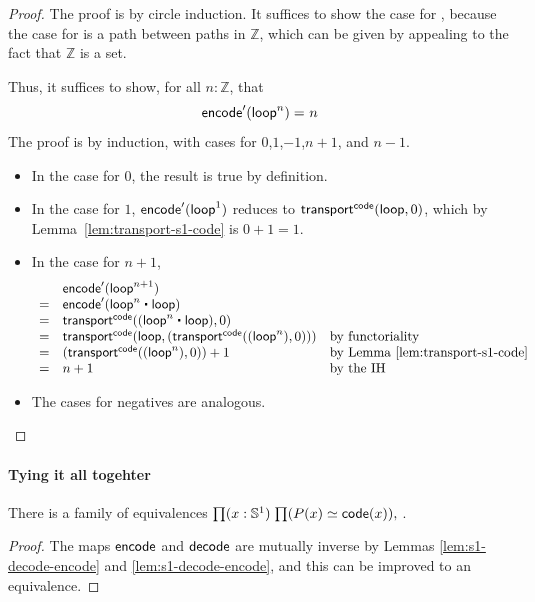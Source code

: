 \begin{proof}
The proof is by circle induction.  It suffices to show the case for
\base, because the case for \lloop is a path between paths in
$\mathbb{Z}$, which can be given by appealing to the fact that $\mathbb{Z}$ is a set.  

Thus, it suffices to show, for all $n : \mathbb{Z}$, that
\[
\mathsf{encode}'(\mathsf{loop}^n) =_{} n
\]
The proof is by induction, with cases for $0$,$1$,$-1$,$n+1$, and
$n-1$.  

\begin{itemize}

\item In the case for $0$, the result is true by definition.

\item In the case for $1$, ${\mathsf{encode}'(\mathsf{loop}^1)}$ reduces to 
$\mathsf{transport}^{\mathsf{code}}(\mathsf{loop},0)$, which by
Lemma~\ref{lem:transport-s1-code} is $0 + 1 = 1$.  

\item In the case for $n+1$, 
\[
\begin{array}{lll}
  & {\encode'(\lloop^{n+1})}  \\
= & {\encode'(\lloop^{n} \ct \lloop)} & \\
= & \transfib{\code}{(\lloop^{n} \ct \lloop)}{0} & \\
= & \transfib{\code}{\lloop}{(\transfib{\code}{(\lloop^n)}{0})} & \text{by functoriality}\\
= & {(\transfib{\code}{(\lloop^n)}{0})} + 1 & \text{by Lemma~\ref{lem:transport-s1-code}}\\
= & n + 1 & \text{by the IH} \\
\end{array}
\]

\item The cases for negatives are analogous.  
\end{itemize}
\end{proof}

\paragraph{Tying it all togehter}

\begin{thm}
There is a family of equivalences $\prd{x : \Sn ^1} {\eqv {P(x)} {\code(x)}}$.  
\end{thm}
\begin{proof}
The maps $\mathsf{encode}$ and $\mathsf{decode}$ are mutually inverse by 
Lemmas \ref{lem:s1-decode-encode} and \ref{lem:s1-decode-encode},
and this can be improved to an equivalence.  
\end{proof}

